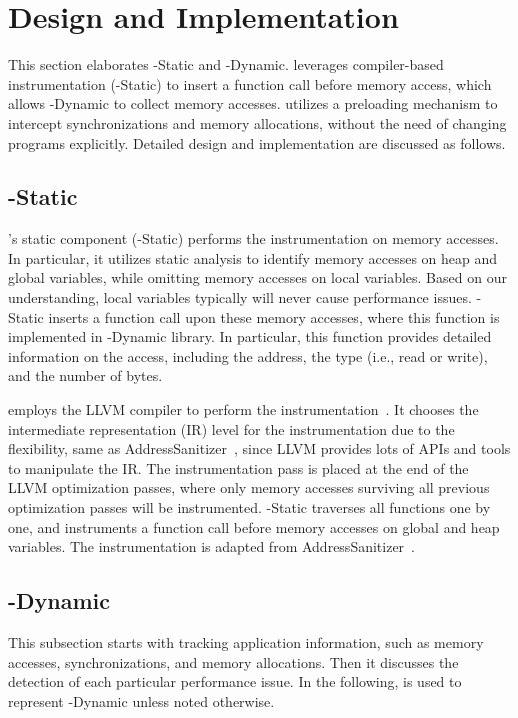 \section{Design and Implementation}
\label{sec:implementation}

This section elaborates \NP{}-Static and \NP{}-Dynamic. \NP{} leverages compiler-based instrumentation (\NP{}-Static) to insert a function call before memory access, which allows \NP{}-Dynamic to collect memory accesses. \NP{} utilizes a preloading mechanism to intercept synchronizations and memory allocations, without the need of changing programs explicitly. Detailed design and implementation are discussed as follows. 

\subsection{\NP{}-Static} 
\NP{}'s static component (\NP{}-Static) performs the instrumentation on memory accesses. In particular, it utilizes static analysis to identify memory accesses on heap and global variables, while omitting memory accesses on local variables. Based on our understanding, local variables typically will never cause performance issues. \NP{}-Static inserts a function call 
upon these memory accesses, where this function is implemented in \NP{}-Dynamic library. In particular, this function provides detailed information on the access, including the address, the type  (i.e., read or write), and the number of bytes.  

\NP{} employs the LLVM compiler to perform the instrumentation~\cite{llvm}. It chooses the intermediate representation (IR) level for the instrumentation due to the flexibility, same as AddressSanitizer~\cite{AddressSanitizer}, since LLVM provides lots of APIs and tools to manipulate the IR. The instrumentation pass is placed at the end of the LLVM optimization passes, where only memory accesses surviving all previous optimization passes will be instrumented.  \NP{}-Static traverses all functions one by one, and instruments a function call before memory accesses on global and heap variables. The instrumentation is adapted from AddressSanitizer~\cite{AddressSanitizer}.


\subsection{\NP{}-Dynamic}

This subsection starts with tracking application information, such as memory accesses, synchronizations, and memory allocations. Then it discusses the detection of each particular performance issue.  In the following, \NP{} is used to represent \NP{}-Dynamic unless noted otherwise. 

